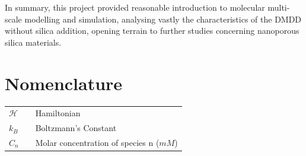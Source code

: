 \documentclass[10pt,a4paper,twoside]{article}
\begin{document}
 In summary, this project provided reasonable introduction to molecular multi-scale modelling and simulation, analysing vastly the characteristics of the DMDD without silica addition, opening terrain to further studies concerning nanoporous silica materials.
 
\section{Nomenclature} 
   \begin{tabulary}{1.0\textwidth}{LCL}
   $\mathcal{H}$ &   & Hamiltonian \\
   $k_B$ & & Boltzmann's Constant\\
   $C_n$ &   & Molar concentration of species n ($mM$) \\
   \end{tabulary}


\vfill
\newpage
\end{document}
